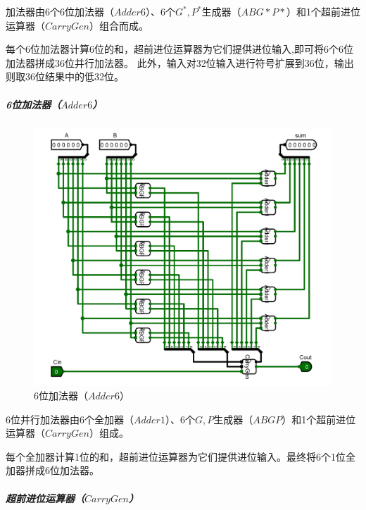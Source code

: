\documentclass[main.tex]{subfiles}
\begin{document}
加法器由6个6位加法器（$Adder6$）、6个$G^*, P^*$生成器（$ABG*P*$）和1个超前进位运算器（$CarryGen$）组合而成。

每个6位加法器计算6位的和，超前进位运算器为它们提供进位输入,即可将6个6位加法器拼成36位并行加法器。
此外，输入对32位输入进行符号扩展到36位，输出则取36位结果中的低32位。



\subparagraph{6位加法器（$Adder6$）} 

\begin{figure}[H]
\centering
\includegraphics[width=\textwidth]{images/Adder6-circuit.png}
\caption{6位加法器（$Adder6$）}
\end{figure}

6位并行加法器由6个全加器（$Adder1$）、6个$G, P$生成器（$ABGP$）和1个超前进位运算器（$CarryGen$）组成。

每个全加器计算1位的和，超前进位运算器为它们提供进位输入。最终将6个1位全加器拼成6位加法器。



\subparagraph{超前进位运算器（$CarryGen$）} 
\end{document}

